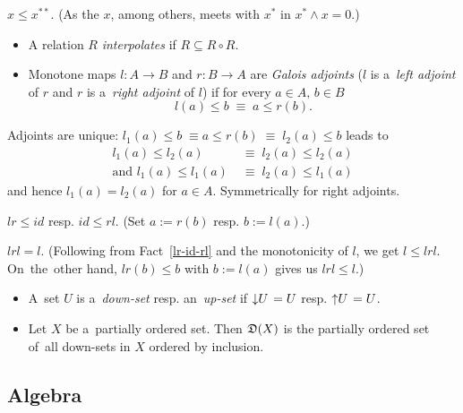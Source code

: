 \begin{fact}
  $x \le x^{**}$.
  (As the $x$, among others, meets with $x^*$ in $x^* \wedge x = 0$.)
\end{fact}

\begin{itemize}
\item A relation $R$ \emph{interpolates} if $R \subseteq R \circ R$.

\item Monotone maps $l\colon A \to B$ and $r\colon B \to A$ are \emph{Galois
  adjoints\/} ($l$ is a~\emph{left adjoint\/} of $r$ and $r$ is a~\emph{right
  adjoint\/} of $l$) if for every $a\in A, \, b\in B$
  \[
    l(a) \le b \; \equiv \; a \le r(b).
  \]
\end{itemize}

\begin{note}
  Adjoints are unique: $l_1(a) \le b \; \equiv a \le r(b) \; \equiv \; l_2(a)
  \le b$ leads to
  \begin{align*}
    l_1(a) \le l_2(a) \; &\equiv \; l_2(a) \le l_2(a) \\
    \text{and } l_1(a) \le l_1(a) \; &\equiv \; l_2(a) \le l_1(a)
  \end{align*}
  and hence $l_1(a) = l_2(a)$ for $a\in A$.
  Symmetrically for right adjoints.
\end{note}

\begin{fact} \label{lr-id-rl}
  $lr \le id$ resp. $id \le rl$.
  (Set $a := r(b)$ resp. $b := l(a)$.)
\end{fact}

\begin{fact} \label{lrl=l}
  $lrl = l$.
  (Following from Fact~\ref{lr-id-rl} and the monotonicity of $l$, we get $l
   \le lrl$.
  On~the~other hand, $lr(b) \le b$ with $b := l(a)$ gives us $lrl \le l$.)
\end{fact}

\begin{itemize}
\item A~set $U$ is a~\emph{down-set\/} resp. an~\emph{up-set\/} if
$\left\downarrow U \right. = U$ resp. $\left\uparrow U \right. = U$.

\item Let $X$ be a~partially ordered set.
Then $\mathfrak{D}(X)$ is the partially ordered set of~all down-sets in $X$ ordered by
inclusion.

\end{itemize}

\subsection*{Algebra}

